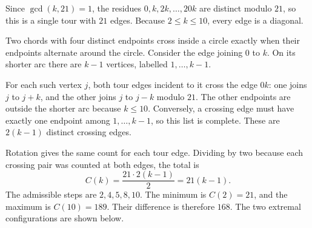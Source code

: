 Since $\gcd(k,21)=1$, the residues $0,k,2k,\ldots,20k$ are distinct modulo $21$, so this is a single tour with $21$ edges. Because $2\le k\le10$, every edge is a diagonal.

Two chords with four distinct endpoints cross inside a circle exactly when their endpoints alternate around the circle. Consider the edge joining $0$ to $k$. On its shorter arc there are $k-1$ vertices, labelled $1,\ldots,k-1$.

For each such vertex $j$, both tour edges incident to it cross the edge $0k$: one joins $j$ to $j+k$, and the other joins $j$ to $j-k$ modulo $21$. The other endpoints are outside the shorter arc because $k\le10$. Conversely, a crossing edge must have exactly one endpoint among $1,\ldots,k-1$, so this list is complete. These are $2(k-1)$ distinct crossing edges.

Rotation gives the same count for each tour edge. Dividing by two because each crossing pair was counted at both edges, the total is
\[
C(k)=\dfrac{21\cdot2(k-1)}{2}=21(k-1).
\]
The admissible steps are $2,4,5,8,10$. The minimum is $C(2)=21$, and the maximum is $C(10)=189$. Their difference is therefore $\boxed{168}$. The two extremal configurations are shown below.

